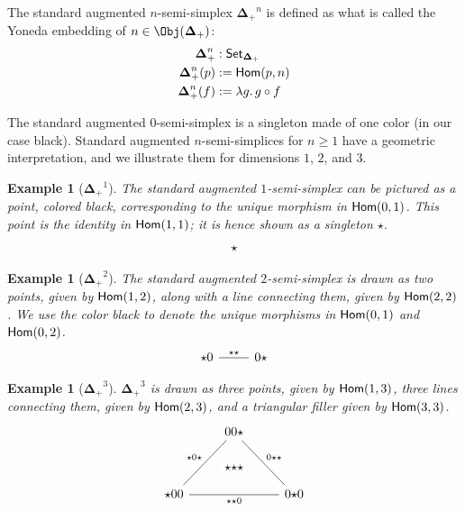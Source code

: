 \documentclass{msc}
\newcommand{\DeltaPlus}{\ensuremath{\boldsymbol{\Delta}_+}}
\newtheorem{example}[therm]{Example}
\newcommand{\kstar}{{\star}}
\begin{document}
\begin{definition}[$\DeltaPlus^n$]
  The standard augmented $n$-semi-simplex $\DeltaPlus^n$ is defined as what is called the Yoneda embedding of $n \in \Obj(\DeltaPlus)$:
  \begin{align*}
    \DeltaPlus^n    & : \Set_{\DeltaPlus}        \\
    \DeltaPlus^n(p) & := \Hom(p, n)              \\
    \DeltaPlus^n(f) & := \lambda g .\, g \circ f
  \end{align*}
\end{definition}

The standard augmented $0$-semi-simplex is a singleton made of one color (in our case black). Standard augmented $n$-semi-simplices for $n\geq 1$ have a geometric interpretation, and we illustrate them for dimensions $1$, $2$, and $3$.

\begin{example}[$\DeltaPlus^1$]
  The standard augmented $1$-semi-simplex can be pictured as a point, colored black, corresponding to the unique morphism in $\mathsf{Hom}(0, 1)$. This point is the identity in $\mathsf{Hom}(1, 1)$; it is hence shown as a singleton $\kstar$.
  \begin{equation*}
    \begin{tikzcd}
      \kstar
    \end{tikzcd}
  \end{equation*}
\end{example}

\begin{example}[$\DeltaPlus^2$]
  The standard augmented $2$-semi-simplex is drawn as two points, given by $\mathsf{Hom}(1, 2)$, along with a line connecting them, given by $\mathsf{Hom}(2, 2)$. We use the color black to denote the unique morphisms in $\mathsf{Hom}(0, 1)$ and $\mathsf{Hom}(0, 2)$.
  \begin{equation*}
    \begin{tikzcd}
      \kstar0 \arrow[r, dash, "\kstar\kstar"] & 0\kstar
    \end{tikzcd}
  \end{equation*}
\end{example}

\begin{example}[$\DeltaPlus^3$]
  $\DeltaPlus^3$ is drawn as three points, given by $\mathsf{Hom}(1, 3)$, three lines connecting them, given by $\mathsf{Hom}(2, 3)$, and a triangular filler given by $\mathsf{Hom}(3, 3)$.
  \begin{equation*}
    \begin{tikzcd}
      & |[alias=F]|00\kstar \arrow[ddr, dash, "0\kstar\kstar"] & \\\\
      \kstar00 \arrow[rr, dash, "\kstar\kstar0"{name=T, below}]\arrow[uur, dash, "\kstar0\kstar"] && 0\kstar0 \\
      \arrow[rightarrow, from=F, to=T, phantom, "\kstar\kstar\kstar" description]
    \end{tikzcd}
  \end{equation*}
\end{example}
\end{document}
